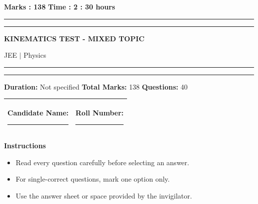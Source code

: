 \documentclass[11pt,a4paper]{article}
\begin{document}
\vspace{2mm}
\noindent \textbf{Marks : 138} \hfill \textbf{Time : 2 : 30 hours}
\noindent\rule{\linewidth}{1.1pt}\vspace{-1mm}\noindent\rule{\linewidth}{0.5pt}
{\centering \Large \textbf{KINEMATICS TEST - MIXED TOPIC}\par}
{\centering JEE $|$ Physics\par}
\noindent\rule{\linewidth}{1.1pt}\vspace{-1mm}\noindent\rule{\linewidth}{0.5pt}
\vspace{1mm}
\noindent \textbf{Duration:} Not specified \quad \textbf{Total Marks:} 138 \quad \textbf{Questions:} 40\par
\vspace{2mm}

\begin{tabularx}{\linewidth}{|X|X|}\hline
Candidate Name: \rule{6cm}{0.4pt} & Roll Number: \rule{3.5cm}{0.4pt} \\\hline
\end{tabularx}

\textbf{Instructions}
\begin{itemize}[topsep=2pt]
\item Read every question carefully before selecting an answer.
\item For single-correct questions, mark one option only.
\item Use the answer sheet or space provided by the invigilator.
\end{itemize}
\end{document}
